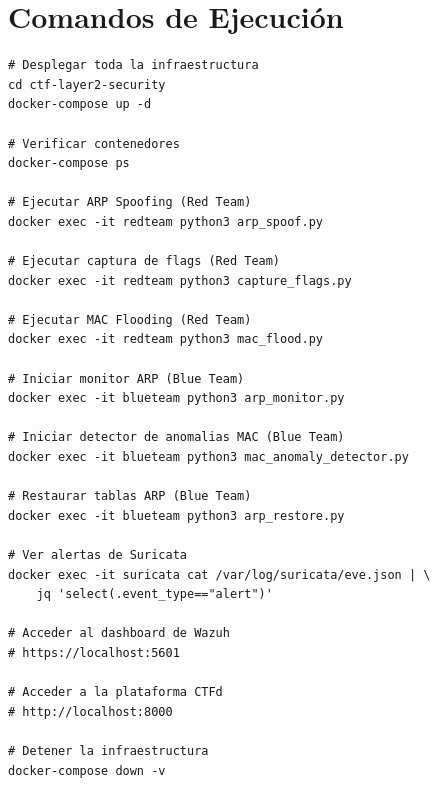 \documentclass[12pt, a4paper]{article}
\begin{document}
\section{Comandos de Ejecuci\'on}
\label{app:commands}

\begin{lstlisting}[style=bashstyle, caption={Comandos para desplegar y ejecutar el laboratorio}]
# Desplegar toda la infraestructura
cd ctf-layer2-security
docker-compose up -d

# Verificar contenedores
docker-compose ps

# Ejecutar ARP Spoofing (Red Team)
docker exec -it redteam python3 arp_spoof.py

# Ejecutar captura de flags (Red Team)
docker exec -it redteam python3 capture_flags.py

# Ejecutar MAC Flooding (Red Team)
docker exec -it redteam python3 mac_flood.py

# Iniciar monitor ARP (Blue Team)
docker exec -it blueteam python3 arp_monitor.py

# Iniciar detector de anomalias MAC (Blue Team)
docker exec -it blueteam python3 mac_anomaly_detector.py

# Restaurar tablas ARP (Blue Team)
docker exec -it blueteam python3 arp_restore.py

# Ver alertas de Suricata
docker exec -it suricata cat /var/log/suricata/eve.json | \
    jq 'select(.event_type=="alert")'

# Acceder al dashboard de Wazuh
# https://localhost:5601

# Acceder a la plataforma CTFd
# http://localhost:8000

# Detener la infraestructura
docker-compose down -v
\end{lstlisting}
\end{document}
